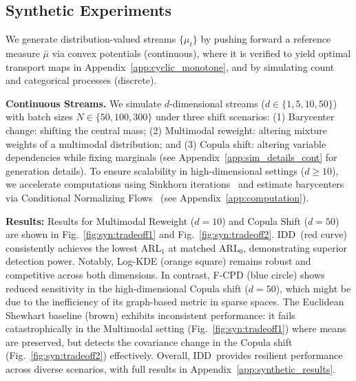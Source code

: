 \documentclass{article}
\newcommand{\algoname}{\textsc{IDD}\xspace}
\theoremstyle{plain}
\theoremstyle{definition}
\theoremstyle{remark}
\begin{document}
\subsection{Synthetic Experiments}
\label{sec:sim_design}
We generate distribution-valued streams $\{\mu_t\}$ by pushing forward a reference measure $\bar\mu$ via convex potentials (continuous), where it is verified to yield optimal transport maps in Appendix~\ref{app:cyclic_monotone}, and by simulating count and categorical processes (discrete).

\textbf{Continuous Streams.}
We simulate $d$-dimensional streams ($d \in \{1, 5, 10, 50\}$) with batch sizes $N \in \{50, 100, 300\}$ under three shift scenarios:
(1) Barycenter change: shifting the central mass;
(2) Multimodal reweight: altering mixture weights of a multimodal distribution; and
(3) Copula shift: altering variable dependencies while fixing marginals (see Appendix~\ref{app:sim_details_cont} for generation details).
To ensure scalability in high-dimensional settings ($d \ge 10$), we accelerate computations using Sinkhorn iterations~\citep{cuturi2013sinkhorn} and estimate barycenters via Conditional Normalizing Flows~\citep{visentin2026computing} (see Appendix~\ref{app:computation}).

\textbf{Results:} Results for Multimodal Reweight ($d=10$) and Copula Shift ($d=50$) are shown in Fig.~\ref{fig:syn:tradeoff1} and Fig.~\ref{fig:syn:tradeoff2}.
\algoname\ (red curve) consistently achieves the lowest $\mathrm{ARL}_1$ at matched $\mathrm{ARL}_0$, demonstrating superior detection power.
Notably, Log-KDE (orange square) remains robust and competitive across both dimensions.
In contrast, F-CPD (blue circle) shows reduced sensitivity in the high-dimensional Copula shift ($d=50$), which might be due to the inefficiency of its graph-based metric in sparse spaces.
The Euclidean Shewhart baseline (brown) exhibits inconsistent performance: it fails catastrophically in the Multimodal setting (Fig.~\ref{fig:syn:tradeoff1}) where means are preserved, but detects the covariance change in the Copula shift (Fig.~\ref{fig:syn:tradeoff2}) effectively.
Overall, \algoname\ provides resilient performance across diverse scenarios, with full results in Appendix~\ref{app:synthetic_results}.
\end{document}

